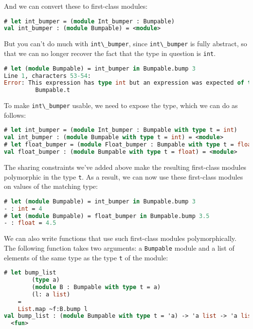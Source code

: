 And we can convert these to first-class modules:

\begin{lstlisting}[language=Caml]
# let int_bumper = (module Int_bumper : Bumpable)
val int_bumper : (module Bumpable) = <module>
\end{lstlisting}

But you can't do much with \passthrough{\lstinline!int\_bumper!}, since
\passthrough{\lstinline!int\_bumper!} is fully abstract, so that we can
no longer recover the fact that the type in question is
\passthrough{\lstinline!int!}.

\begin{lstlisting}[language=Caml]
# let (module Bumpable) = int_bumper in Bumpable.bump 3
Line 1, characters 53-54:
Error: This expression has type int but an expression was expected of type
         Bumpable.t
\end{lstlisting}

To make \passthrough{\lstinline!int\_bumper!} usable, we need to expose
the type, which we can do as follows:

\begin{lstlisting}[language=Caml]
# let int_bumper = (module Int_bumper : Bumpable with type t = int)
val int_bumper : (module Bumpable with type t = int) = <module>
# let float_bumper = (module Float_bumper : Bumpable with type t = float)
val float_bumper : (module Bumpable with type t = float) = <module>
\end{lstlisting}

The sharing constraints we've added above make the resulting first-class
modules {polymorphic} in the type \passthrough{\lstinline!t!}. As a
result, we can now use these first-class modules on values of the
matching type:

\begin{lstlisting}[language=Caml]
# let (module Bumpable) = int_bumper in Bumpable.bump 3
- : int = 4
# let (module Bumpable) = float_bumper in Bumpable.bump 3.5
- : float = 4.5
\end{lstlisting}

We can also write functions that use such first-class modules
polymorphically. The following function takes two arguments: a
\passthrough{\lstinline!Bumpable!} module and a list of elements of the
same type as the type \passthrough{\lstinline!t!} of the module:

\begin{lstlisting}[language=Caml]
# let bump_list
        (type a)
        (module B : Bumpable with type t = a)
        (l: a list)
    =
    List.map ~f:B.bump l
val bump_list : (module Bumpable with type t = 'a) -> 'a list -> 'a list =
  <fun>
\end{lstlisting}

